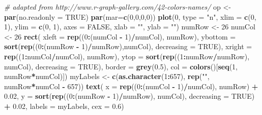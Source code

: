 \documentclass[]{book}
\newenvironment{Shaded}{\begin{snugshade}}{\end{snugshade}}
\newcommand{\KeywordTok}[1]{\textcolor[rgb]{0.13,0.29,0.53}{\textbf{#1}}}
\newcommand{\DataTypeTok}[1]{\textcolor[rgb]{0.13,0.29,0.53}{#1}}
\newcommand{\DecValTok}[1]{\textcolor[rgb]{0.00,0.00,0.81}{#1}}
\newcommand{\FloatTok}[1]{\textcolor[rgb]{0.00,0.00,0.81}{#1}}
\newcommand{\StringTok}[1]{\textcolor[rgb]{0.31,0.60,0.02}{#1}}
\newcommand{\CommentTok}[1]{\textcolor[rgb]{0.56,0.35,0.01}{\textit{#1}}}
\newcommand{\OtherTok}[1]{\textcolor[rgb]{0.56,0.35,0.01}{#1}}
\newcommand{\OperatorTok}[1]{\textcolor[rgb]{0.81,0.36,0.00}{\textbf{#1}}}
\newcommand{\NormalTok}[1]{#1}
\theoremstyle{definition}
\theoremstyle{definition}
\theoremstyle{definition}
\theoremstyle{remark}
\begin{document}
\begin{Shaded}
\begin{Highlighting}[]
\CommentTok{# adapted from http://www.r-graph-gallery.com/42-colors-names/}
\NormalTok{op <-}\StringTok{ }\KeywordTok{par}\NormalTok{(}\DataTypeTok{no.readonly =} \OtherTok{TRUE}\NormalTok{)}
\KeywordTok{par}\NormalTok{(}\DataTypeTok{mar=}\KeywordTok{c}\NormalTok{(}\DecValTok{0}\NormalTok{,}\DecValTok{0}\NormalTok{,}\DecValTok{0}\NormalTok{,}\DecValTok{0}\NormalTok{))}
\KeywordTok{plot}\NormalTok{(}\DecValTok{0}\NormalTok{, }\DataTypeTok{type =} \StringTok{"n"}\NormalTok{, }\DataTypeTok{xlim =} \KeywordTok{c}\NormalTok{(}\DecValTok{0}\NormalTok{, }\DecValTok{1}\NormalTok{), }\DataTypeTok{ylim =} \KeywordTok{c}\NormalTok{(}\DecValTok{0}\NormalTok{, }\DecValTok{1}\NormalTok{), }
  \DataTypeTok{axes =} \OtherTok{FALSE}\NormalTok{, }\DataTypeTok{xlab =} \StringTok{""}\NormalTok{, }\DataTypeTok{ylab =} \StringTok{""}\NormalTok{)}
\NormalTok{numRow <-}\StringTok{ }\DecValTok{26}
\NormalTok{numCol <-}\StringTok{ }\DecValTok{26}
\KeywordTok{rect}\NormalTok{(}
  \DataTypeTok{xleft =} \KeywordTok{rep}\NormalTok{((}\DecValTok{0}\OperatorTok{:}\NormalTok{(numCol }\OperatorTok{-}\StringTok{ }\DecValTok{1}\NormalTok{)}\OperatorTok{/}\NormalTok{numCol), numRow),  }
  \DataTypeTok{ybottom =} \KeywordTok{sort}\NormalTok{(}\KeywordTok{rep}\NormalTok{((}\DecValTok{0}\OperatorTok{:}\NormalTok{(numRow }\OperatorTok{-}\StringTok{ }\DecValTok{1}\NormalTok{)}\OperatorTok{/}\NormalTok{numRow),numCol), }\DataTypeTok{decreasing =} \OtherTok{TRUE}\NormalTok{),}
  \DataTypeTok{xright =} \KeywordTok{rep}\NormalTok{((}\DecValTok{1}\OperatorTok{:}\NormalTok{numCol}\OperatorTok{/}\NormalTok{numCol), numRow),}
  \DataTypeTok{ytop =} \KeywordTok{sort}\NormalTok{(}\KeywordTok{rep}\NormalTok{((}\DecValTok{1}\OperatorTok{:}\NormalTok{numRow}\OperatorTok{/}\NormalTok{numRow), numCol), }\DataTypeTok{decreasing =} \OtherTok{TRUE}\NormalTok{),}
  \DataTypeTok{border =} \KeywordTok{grey}\NormalTok{(}\FloatTok{0.5}\NormalTok{), }
  \DataTypeTok{col =} \KeywordTok{colors}\NormalTok{()[}\KeywordTok{seq}\NormalTok{(}\DecValTok{1}\NormalTok{, numRow}\OperatorTok{*}\NormalTok{numCol)])}
\NormalTok{myLabels <-}\StringTok{ }\KeywordTok{c}\NormalTok{(}\KeywordTok{as.character}\NormalTok{(}\DecValTok{1}\OperatorTok{:}\DecValTok{657}\NormalTok{), }\KeywordTok{rep}\NormalTok{(}\StringTok{""}\NormalTok{, numRow}\OperatorTok{*}\NormalTok{numCol }\OperatorTok{-}\StringTok{ }\DecValTok{657}\NormalTok{))}
\KeywordTok{text}\NormalTok{(}
  \DataTypeTok{x =} \KeywordTok{rep}\NormalTok{((}\DecValTok{0}\OperatorTok{:}\NormalTok{(numCol }\OperatorTok{-}\StringTok{ }\DecValTok{1}\NormalTok{)}\OperatorTok{/}\NormalTok{numCol), numRow) }\OperatorTok{+}\StringTok{ }\FloatTok{0.02}\NormalTok{,}
  \DataTypeTok{y =} \KeywordTok{sort}\NormalTok{(}\KeywordTok{rep}\NormalTok{((}\DecValTok{0}\OperatorTok{:}\NormalTok{(numRow }\OperatorTok{-}\StringTok{ }\DecValTok{1}\NormalTok{)}\OperatorTok{/}\NormalTok{numRow), numCol), }\DataTypeTok{decreasing =} \OtherTok{TRUE}\NormalTok{) }\OperatorTok{+}\StringTok{ }\FloatTok{0.02}\NormalTok{,}
  \DataTypeTok{labels =}\NormalTok{ myLabels, }
  \DataTypeTok{cex =} \FloatTok{0.6}\NormalTok{)}
\end{Highlighting}
\end{Shaded}
\end{document}
